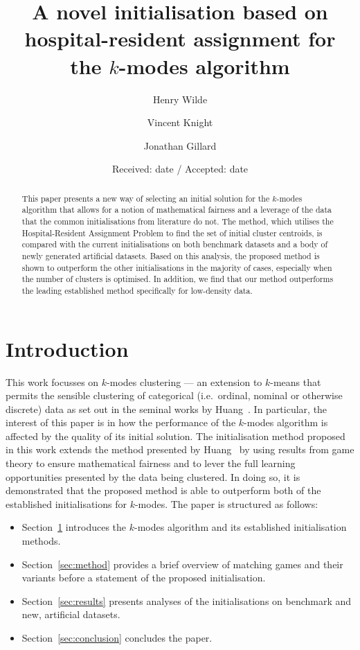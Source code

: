 \documentclass[smallextended]{svjour3}
\title{%
    A novel initialisation based on hospital-resident assignment for the
    \(k\)-modes algorithm
}
\author{Henry Wilde \and Vincent Knight \and Jonathan Gillard}
\institute{%
    School of Mathematics, Senghennydd Rd, Cardiff, WALES CF24 4AG \\
    \textit{\email{\{wildehd, knightva, gillardjw\}@cardiff.ac.uk}}
}
\date{Received: date / Accepted: date}
\begin{document}
\maketitle%

\begin{abstract}
    This paper presents a new way of selecting an initial solution for the
    \(k\)-modes algorithm that allows for a notion of mathematical fairness and
    a leverage of the data that the common initialisations from literature do
    not. The method, which utilises the Hospital-Resident Assignment Problem to
    find the set of initial cluster centroids, is compared with the current
    initialisations on both benchmark datasets and a body of newly generated
    artificial datasets. Based on this analysis, the proposed method is shown to
    outperform the other initialisations in the majority of cases, especially
    when the number of clusters is optimised. In addition, we find that our
    method outperforms the leading established method specifically for
    low-density data.

\end{abstract}

\section{Introduction}\label{sec:intro}

This work focusses on \(k\)-modes clustering --- an extension to
\(k\)-means that permits the sensible clustering of categorical (i.e.\ ordinal,
nominal or otherwise discrete) data as set out in the seminal works by
Huang~\cite{Huang1997a,Huang1997b,Huang1998}. In particular, the interest of
this paper is in how the performance of the \(k\)-modes algorithm is affected by
the quality of its initial solution. The initialisation method proposed in this
work extends the method presented by Huang~\cite{Huang1998} by using results
from game theory to ensure mathematical fairness and to lever the full learning
opportunities presented by the data being clustered. In doing so, it is
demonstrated that the proposed method is able to outperform both of the
established initialisations for \(k\)-modes. The paper is structured as follows:
\begin{itemize}
    \item Section~\ref{sec:intro} introduces the \(k\)-modes algorithm and its
        established initialisation methods.
    \item Section~\ref{sec:method} provides a brief overview of
        matching games and their variants before a statement of the proposed
        initialisation.
    \item Section~\ref{sec:results} presents analyses of the initialisations
        on benchmark and new, artificial datasets.
    \item Section~\ref{sec:conclusion} concludes the paper.
\end{itemize}
\end{document}
